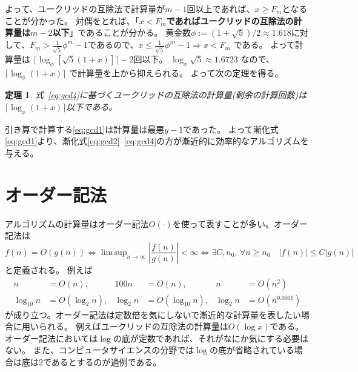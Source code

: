 \documentclass[a4paper,oneside,onecolumn,openany,article,10pt]{memoir}
\newtheorem{theorem}{定理}
\theoremstyle{remark}
\begin{document}
よって、ユークリッドの互除法で計算量が$m-1$回以上であれば、$x\ge F_{m}$となることが分かった。
対偶をとれば、「\textbf{$x <F_{m}$であればユークリッドの互除法の計算量は$m-2$以下}」であることが分かる。
黄金数$\phi:=(1+\sqrt{5})/2\approx 1.618$に対して、$F_m> \frac1{\sqrt{5}}\phi^m-1$であるので、$x \le \frac1{\sqrt{5}}\phi^{m} -1 \Rightarrow x< F_{m}$ である。
よって計算量は $\lceil\log_\phi[\sqrt{5}(1+x)]\rceil-2$回以下。
$\log_\phi \sqrt{5} \approx 1.6723$ なので、$\lceil\log_\phi (1+x)\rceil$ で計算量を上から抑えられる。
よって次の定理を得る。
\begin{theorem}
式~\eqref{eq:gcd4}に基づくユークリッドの互除法の計算量(剰余の計算回数)は$\lceil\log_\phi(1+x)\rceil$以下である。
\end{theorem}
引き算で計算する\eqref{eq:gcd1}は計算量は最悪$y-1$であった。
よって漸化式\eqref{eq:gcd1}より、漸化式\eqref{eq:gcd2}--\eqref{eq:gcd4}の方が漸近的に効率的なアルゴリズムを与える。


\section{オーダー記法}
アルゴリズムの計算量はオーダー記法$O(\cdot)$を使って表すことが多い。オーダー記法は
\begin{equation*}
f(n)=O(g(n)) \iff \mathop{\mathrm{lim\,sup}}_{n\to\infty} \left|\frac{f(n)}{g(n)}\right| < \infty
\iff \exists C, n_0,\, \forall n\ge n_0\quad |f(n)|\le C|g(n)|
\end{equation*}
と定義される。
例えば
\begin{align*}
n &= O(n),&
100n &= O(n),&
n &= O(n^2)\\
\log_{10} n &= O(\log_{2} n),&
\log_{2} n &= O(\log_{10} n),&
\log_2 n &= O(n^{0.0001})
\end{align*}
が成り立つ。オーダー記法は定数倍を気にしないで漸近的な計算量を表したい場合に用いられる。
例えばユークリッドの互除法の計算量は$O(\log x)$である。オーダー記法においては$\log$の底が定数であれば、それがなにか気にする必要はない。
また、コンピュータサイエンスの分野では$\log$の底が省略されている場合は底は2であるとするのが通例である。
\end{document}
